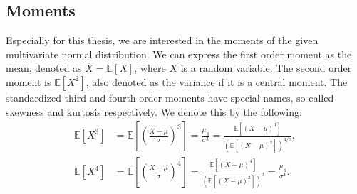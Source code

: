 \subsection{Moments}\label{subsec:moments}

Especially for this thesis, we are interested in the moments of the given multivariate normal distribution.
We can express the first order moment as the mean,
denoted as $\overline{X} = \mathbb{E}[X]$, where $X$ is a random variable.
The second order moment is $\mathbb{E}[X^2]$, also denoted as the variance if it is a central moment.
The standardized third and fourth order moments have special names,
so-called skewness and kurtosis respectively.
We denote this by the following:
\begin{align}
    \mathbb{E}[X^3]
    &= \mathbb{E}\left[\left(\frac{X-\mu}{\sigma}\right)^3\right]
    = \frac{\mu_3}{\sigma^3}
    = \frac{\mathbb{E}[(X-\mu)^3]}{(\mathbb{E}[(X-\mu)^2])^{3/2}}, \\
    \mathbb{E}[X^4]
    &= \mathbb{E}\left[\left(\frac{X-\mu}{\sigma}\right)^4\right]
    = \frac{\mathbb{E}[(X-\mu)^4]}{(\mathbb{E}[(X-\mu)^2])^2}
    = \frac{\mu_4}{\sigma^4}.
\end{align}